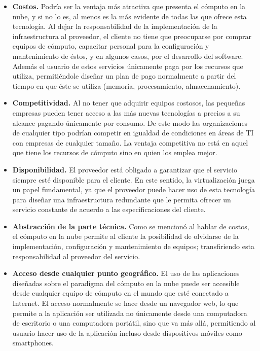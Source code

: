 \begin{itemize}
	\item \textbf{Costos.} Podría ser la ventaja más atractiva que presenta el cómputo en la nube, y si no lo es, al menos es la más evidente de todas las que ofrece esta tecnología. Al dejar la responsabilidad de la implementación de la infraestructura al proveedor, el cliente no tiene que preocuparse por comprar equipos de cómputo, capacitar personal para la configuración y mantenimiento de éstos, y en algunos casos, por el desarrollo del software. Además el usuario de estos servicios únicamente paga por los recursos que utiliza, permitiéndole diseñar un plan de pago normalmente a partir del tiempo en que éste se utiliza (memoria, procesamiento, almacenamiento).

	\item \textbf{Competitividad.} Al no tener que adquirir equipos costosos, las pequeñas empresas pueden tener acceso a las más nuevas tecnologías a precios a su alcance pagando únicamente por consumo. De este modo las organizaciones de cualquier tipo podrían competir en igualdad de condiciones en áreas de TI con empresas de cualquier tamaño. La ventaja competitiva no está en aquel que tiene los recursos de cómputo sino en quien los emplea mejor.

	\item \textbf{Disponibilidad.} El proveedor está obligado a garantizar que el servicio siempre esté disponible para el cliente. En este sentido, la virtualización juega un papel fundamental, ya que el proveedor puede hacer uso de esta tecnología para diseñar una infraestructura redundante que le permita ofrecer un servicio constante de acuerdo a las especificaciones del cliente.


	\item \textbf{Abstracción de la parte técnica.} Como se mencionó al hablar de costos, el cómputo en la nube permite al cliente la posibilidad de olvidarse de la implementación, configuración y mantenimiento de equipos; transfiriendo esta responsabilidad al proveedor del servicio.

	\item \textbf{Acceso desde cualquier punto geográfico.} El uso de las aplicaciones diseñadas sobre el paradigma del cómputo en la nube puede ser accesible desde cualquier equipo de cómputo en el mundo que esté conectado a Internet. El acceso normalmente se hace desde un navegador web, lo que permite a la aplicación ser utilizada no únicamente desde una computadora de escritorio o una computadora portátil, sino que va más allá, permitiendo al usuario hacer uso de la aplicación incluso desde dispositivos móviles como smartphones.


\end{itemize}
